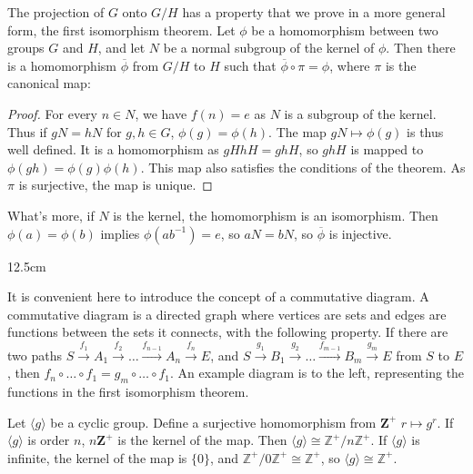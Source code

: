 \documentclass{report}
\begin{document}
The projection of $G$ onto $G/H$ has a property that we prove in a more general form, the first isomorphism theorem. Let $\phi$ be a homomorphism between two groups $G$ and $H$, and let $N$ be a normal subgroup of the kernel of $\phi$. Then there is a homomorphism $\overline{\phi}$ from $G/H$ to $H$ such that $\overline{\phi} \circ \pi = \phi$, where $\pi$ is the canonical map:
\begin{proof}
    For every $n \in N$, we have $f(n) = e$ as $N$ is a subgroup of the kernel. Thus if $gN = hN$ for $g,h \in G$, $\phi(g) = \phi(h)$. The map $gN \mapsto \phi(g)$ is thus well defined. It is a homomorphism as $gHhH = ghH$, so $ghH$ is mapped to $\phi(gh) = \phi(g)\phi(h)$. This map also satisfies the conditions of the theorem. As $\pi$ is surjective, the map is unique.
\end{proof}

What's more, if $N$ is the kernel, the homomorphism is an isomorphism. Then $\phi(a) = \phi(b)$ implies $\phi(ab^{-1}) = e$, so $aN = bN$, so $\overline{\phi}$ is injective.

\begin{wrapfigure}{1}{2.5cm}
\end{wrapfigure}

It is convenient here to introduce the concept of a commutative diagram. A commutative diagram is a directed graph where vertices are sets and edges are functions between the sets it connects, with the following property. If there are two paths $S \xrightarrow{f_1} A_1 \xrightarrow{f_2} \dots \xrightarrow{f_{n-1}} A_n \xrightarrow{f_n} E$, and $S \xrightarrow{g_1} B_1 \xrightarrow{g_2} \dots \xrightarrow{f_{m-1}} B_m \xrightarrow{g_m} E$ from $S$ to $E$, then $f_n \circ \dots \circ f_1 = g_m \circ \dots \circ f_1$. An example diagram is to the left, representing the functions in the first isomorphism theorem.

Let $\langle g \rangle$ be a cyclic group. Define a surjective homomorphism from $\mathbf{Z}^+$ $r \mapsto g^r$. If $\langle g \rangle$ is order $n$, $n\mathbf{Z}^+$ is the kernel of the map. Then $\langle g \rangle \cong \mathbb{Z}^+/n\mathbb{Z}^+$. If $\langle g \rangle$ is infinite, the kernel of the map is $\{ 0 \}$, and $\mathbb{Z}^+/0\mathbb{Z}^+ \cong \mathbb{Z}^+$, so $\langle g \rangle \cong \mathbb{Z}^+$.
\end{document}
